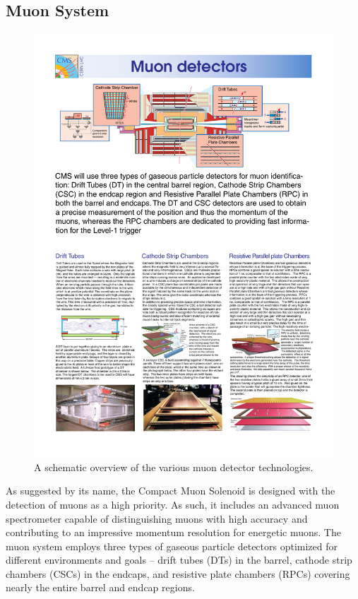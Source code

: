 \subsection{Muon System}

\begin{figure}
  \centering
  \includegraphics[width=\textwidth]{figures/cms-muon-system}
  \caption{A schematic overview of the various muon detector technologies.}
  \label{fig:cms-muon-system}
\end{figure}

As suggested by its name, the Compact Muon Solenoid is designed with the detection of muons as a high priority.  As such, it includes an advanced muon spectrometer capable of distinguishing muons with high accuracy and contributing to an impressive momentum resolution for energetic muons.  The muon system employs three types of gaseous particle detectors optimized for different environments and goals -- drift tubes (DTs) in the barrel, cathode strip chambers (CSCs) in the endcaps, and resistive plate chambers (RPCs) covering nearly the entire barrel and endcap regions.

